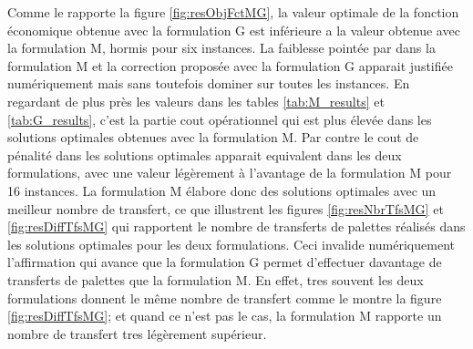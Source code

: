 \documentclass[preprint,12pt,authoryear]{elsarticle}
\begin{document}



Comme le rapporte la figure \ref{fig:resObjFctMG}, la valeur optimale de la fonction économique obtenue avec la formulation G est inférieure a la valeur obtenue avec la formulation M, hormis pour six instances.
La faiblesse pointée par \citet{Gelareh2015} dans la formulation M et la correction proposée avec la formulation G apparait justifiée numériquement mais sans toutefois dominer sur toutes les instances.
En regardant de plus près les valeurs dans les tables \ref{tab:M_results} et \ref{tab:G_results}, c'est la partie cout opérationnel qui est plus élevée dans les solutions optimales obtenues avec la formulation M.
Par contre le cout de pénalité dans les solutions optimales apparait equivalent dans les deux formulations, avec une valeur légèrement à l'avantage de la formulation M pour 16 instances.
La formulation M élabore donc des solutions optimales avec un meilleur nombre de transfert, ce que illustrent les figures \ref{fig:resNbrTfsMG} et \ref{fig:resDiffTfsMG} qui rapportent le nombre de transferts de palettes réalisés dans les solutions optimales pour les deux formulations.
Ceci invalide numériquement l'affirmation qui avance que la formulation G  permet d'effectuer davantage de transferts de palettes que la formulation M. 
En effet, tres souvent les deux formulations donnent le même nombre de transfert comme le montre la figure \ref{fig:resDiffTfsMG}; et quand ce n'est pas le cas, la formulation M rapporte un nombre de transfert tres légèrement supérieur.
\end{document}
